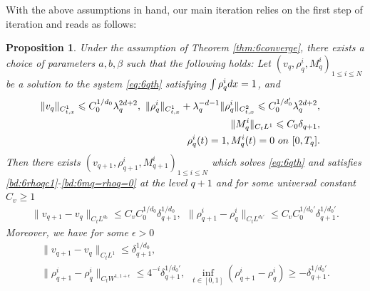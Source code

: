 \documentclass[10pt,a4paper]{amsart}
\numberwithin{equation}{section}
\newtheorem{proposition}[theorem]{Proposition}
\def\dif{{\mathord{{\rm d}}}}
\def\geq{\geqslant}
\def\leq{\leqslant}
\def\dif{{\mathord{{\rm d}}}}
\def\bp{\begin{proposition}}
\def\ep{\end{proposition}}
\def\geq{\geqslant}
\def\leq{\leqslant}
\begin{document}
With the above assumptions in hand, our main iteration relies on the first step of iteration and reads as follows:


\bp\label{prop:case6} 
Under the assumption of Theorem \ref{thm:6converge}, there exists   a choice of parameters $a,b,\beta$  such
that the following holds: Let $(v_q,\rho^{i}_q,  M^{i}_q)_{1\leq i\leq N}$ be a solution to the system \eqref{eq:6qth} satisfying  $\int\rho^{i}_q\dif x=1$,
and
\begin{align}
\|v_q\|_{C_{t,x}^1}\leq C_0^{1/d_0}\lambda_q^{2d+2},\
\|\rho^{i}_{q}\|_{C_{t,x}^1}+\lambda_q^{-d-1}\|\rho^{i}_{q}\|_{C_{t,x}^2}\leq C_0^{1/d_0'}\lambda_q^{2d+2},
\label{bd:6rhoqc1}\\
 \|M^{i}_q\|_{C_tL^1}\leq C_0 \delta_{q+1},&\label{bd:6rql1} \\
  \rho^{i}_q(t)=1, M^{i}_q(t)=0\ {\rm on}\ [0,T_q].&\label{bd:6mq=rhoq=0}
\end{align}
Then there exists 
$(v_{q+1},\rho^{i}_{q+1},  M^{i}_{q+1})_{1\leq i\leq N}$ which solves \eqref{eq:6qth} and satisfies \eqref{bd:6rhoqc1}-\eqref{bd:6mq=rhoq=0} at the level $q+1$ and for some universal constant $C_v\geq1$
\begin{align}
\|v_{q+1}-v_{q}\|_{C_tL^{d_0}}\leq
C_vC_0^{1/d_0}\delta_{q+1}^{1/d_0},\label{bd:6vq+1-vqldd}\ \
\|\rho^{i}_{q+1}-\rho^{i}_{q}\|_{C_tL^{d_0'}}\leq
C_v C_0^{1/{d_0'}} \delta_{q+1}^{1/{d_0'}}.%
\end{align}
Moreover, we have for some $\epsilon>0$
\begin{align}
   \|v_{q+1}-v_q\|_{C_tL^1}\leq
\delta_{q+1}^{1/d_0},\label{bd:6vq+1-vqlpr}\\
\|\rho^{i}_{q+1}-\rho^{i}_{q}\|_{C_tW^{1,1+\epsilon}}%
\leq
 4^{-i}\delta_{q+1}^{1/d_0'},\ \  \inf_{t\in [0,1]}(\rho^{i}_{q+1} - \rho^{i}_q)\geq - \delta_{q+1}^{1/d_0'} .\label{bd:6rhoq+1-rhoql1}
\end{align}
\ep
  
\end{document}
